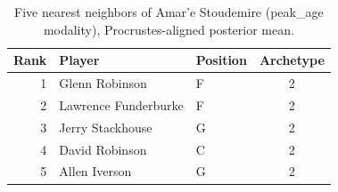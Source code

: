 \begin{table}[htbp]
  \centering\small
  \begin{tabular}{rllc}
    \toprule
    Rank & Player & Position & Archetype \\
    \midrule
    1 & Glenn Robinson & F & 2 \\
    2 & Lawrence Funderburke & F & 2 \\
    3 & Jerry Stackhouse & G & 2 \\
    4 & David Robinson & C & 2 \\
    5 & Allen Iverson & G & 2 \\
    \bottomrule
  \end{tabular}
  \caption{Five nearest neighbors of Amar'e Stoudemire (peak_age modality), Procrustes-aligned posterior mean.}
  \label{tab:Amar_e_Stoudemire_neighbors_peak_age}
\end{table}

